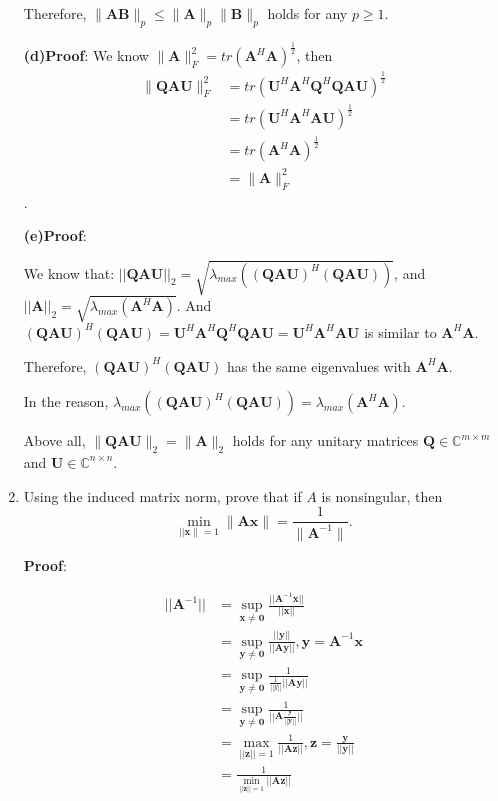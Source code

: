 \documentclass[12pt, a4paper, UTF8]{ctexart}
\begin{document}
\begin{enumerate}
		Therefore, $\|\bm{AB}\|_{p}\leq\|\bm{A}\|_{p}\|\bm{B}\|_{p}$ holds for any $p\geq 1$.

		\textbf{(d)Proof}:
		We know $\|\bm{A}\|_{F}^{2}={tr}(\bm{A}^{H}\bm{A})^{\frac{1}{2}}$, then 
		\begin{align*}
			\|\bm{Q}\bm{A}\bm{U}\|_{F}^{2}&={tr}(\bm{U}^{H}\bm{A}^{H}\bm{Q}^{H}\bm{Q}\bm{A}\bm{U})^{\frac{1}{2}} \\
			&={tr}(\bm{U}^{H}\bm{A}^{H}\bm{A}\bm{U})^{\frac{1}{2}} \\
			&={tr}(\bm{A}^{H}\bm{A})^{\frac{1}{2}} \\
			&=\|\bm{A}\|_{F}^{2}
		\end{align*}.

		\textbf{(e)Proof}:
		
		We know that: $||\bm{QAU}||_2=\sqrt{\lambda_{max}((\bm{QAU})^H(\bm{QAU}))}$, and $||\bm{A}||_2 =\sqrt{\lambda_{max}(\bm{A}^H\bm{A})}$. And $(\bm{QAU})^H(\bm{QAU}) = \bm{U}^H\bm{A}^H\bm{Q}^H\bm{QAU} = \bm{U}^H \bm{A}^H\bm{A}\bm{U}$ is similar to $\bm{A}^H\bm{A}$. 
		
		Therefore, $(\bm{QAU})^H(\bm{QAU})$ has the same eigenvalues with $\bm{A}^H\bm{A}$. 
		
		In the reason, $\lambda_{max}((\bm{QAU})^H(\bm{QAU}))=\lambda_{max}(\bm{A}^H\bm{A})$.

		Above all, $\|\bm{QAU}\|_{2}=\|\bm{A}\|_{2}$ holds for any unitary matrices $\bm{Q}\in \mathbb{C}^{m\times m}$ and $\bm{U}\in \mathbb{C}^{n\times n}.$

		\item
		Using the induced matrix norm, prove that if $A$ is nonsingular, then
		$$\min_{||\bm{x}\|=1}\|\bm{Ax}\|=\frac{1}{\|\bm{A}^{-1}\|}.$$

		\textbf{Proof}:
		
		\begin{align*}
			||\bm{A}^{-1}||&=\mathop{sup}\limits_{\bm{x}\neq\bm{0}}\frac{||\bm{A}^{-1}\bm{x}||}{||\bm{x}||} \\
			&=\mathop{sup}\limits_{\bm{y}\neq\bm{0}}\frac{||\bm{y}||}{||\bm{Ay}||}, \bm{y}=\bm{A}^{-1}\bm{x} \\
			&=\mathop{sup}\limits_{\bm{y}\neq\bm{0}}\frac{1}{\frac{1}{||y||}||\bm{Ay}||} \\
			&=\mathop{sup}\limits_{\bm{y}\neq\bm{0}}\frac{1}{||\bm{A}\frac{\bm{y}}{||\bm{y}||}||} \\
			&=\mathop{max}\limits_{||\bm{z}||= 1}\frac{1}{||\bm{Az}||}, \bm{z}=\frac{\bm{y}}{||\bm{y}||}\\
			&=\frac{1}{\mathop {min}\limits_{||\bm{z}||=1}||\bm{Az}||}
		\end{align*}


\end{enumerate}
\end{document}
